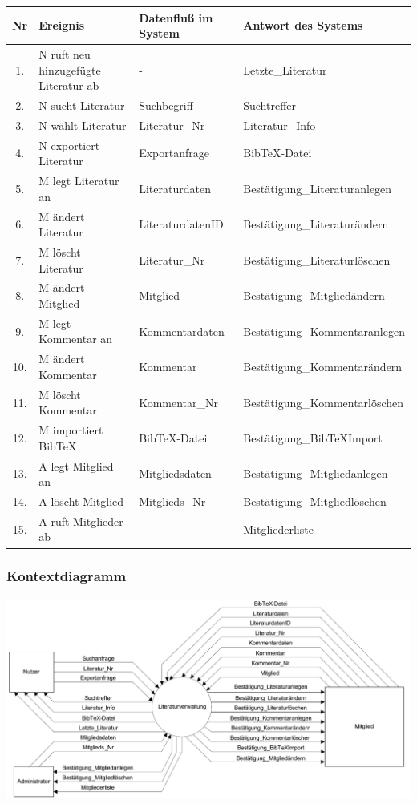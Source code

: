 \begin{longtable}{|c|p{9.0em}|p{10.5em}|l|}
\hline
Nr & Ereignis & Datenfluß im System & Antwort des Systems \\
\hline\hline
\endhead

1. & N ruft neu hinzugefügte Literatur ab & - & Letzte\_Literatur \\\hline
2. & N sucht Literatur & Suchbegriff & Suchtreffer \\\hline
3. & N wählt Literatur & Literatur\_Nr & Literatur\_Info \\\hline
4. & N exportiert Literatur & Exportanfrage &  BibTeX-Datei \\\hline
5. & M legt Literatur an & Literaturdaten & Bestätigung\_Literaturanlegen \\\hline
6. & M ändert Literatur & LiteraturdatenID & Bestätigung\_Literaturändern\\\hline
7. & M löscht Literatur & Literatur\_Nr & Bestätigung\_Literaturlöschen \\\hline
8. & M ändert Mitglied & Mitglied & Bestätigung\_Mitgliedändern \\\hline
9. & M legt Kommentar an & Kommentardaten & Bestätigung\_Kommentaranlegen \\\hline
10. & M ändert Kommentar & Kommentar & Bestätigung\_Kommentarändern \\\hline
11. & M löscht Kommentar & Kommentar\_Nr & Bestätigung\_Kommentarlöschen \\\hline
12.& M importiert BibTeX & BibTeX-Datei & Bestätigung\_BibTeXImport \\\hline
13.& A legt Mitglied an & Mitgliedsdaten & Bestätigung\_Mitgliedanlegen \\\hline
14.& A löscht Mitglied & Mitglieds\_Nr & Bestätigung\_Mitgliedlöschen \\\hline
15.& A ruft Mitglieder ab & - & Mitgliederliste \\\hline
\end{longtable}

\newpage %
\subsubsection{Kontextdiagramm}

\includegraphics[scale=0.75]{kontextdiagramm}

